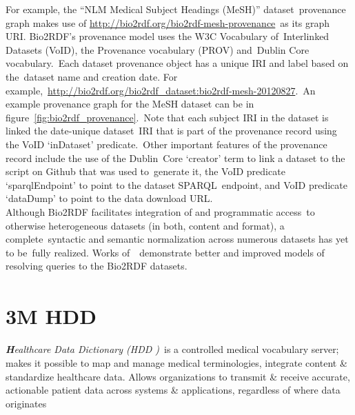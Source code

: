 \documentclass[DIV=calc, paper=a4, fontsize=12pt, onecolumn]{scrartcl}	 %
\newcommand{\initial}[1]{ %
\lettrine[lines=3,lhang=0.3,nindent=0em,slope=0em]{
\color{DarkBlue}
{\textbf{\textit{#1}}}}{}}
\begin{document}
  \noindent For example, the ``NLM Medical Subject Headings (MeSH)'' dataset\
  provenance graph makes use of \url{http://bio2rdf.org/bio2rdf-mesh-provenance}\
  as its graph URI. Bio2RDF's provenance model uses the W3C Vocabulary of\
  Interlinked Datasets (VoID), the Provenance vocabulary (PROV) and\
  Dublin Core vocabulary.\
  Each dataset provenance object has a unique IRI and label based on the\
  dataset name and creation date. For example,\
  \url{http://bio2rdf.org/bio2rdf_dataset:bio2rdf-mesh-20120827}.\
  An example provenance graph for the MeSH dataset can be in figure~\ref{fig:bio2rdf_provenance}.\
  Note that each subject IRI in the dataset is linked the date-unique dataset\
  IRI that is part of the provenance record using the VoID `inDataset' predicate.\
  Other important features of the provenance record include the use of the Dublin\
  Core `creator' term to link a dataset to the script on Github that was used to\
  generate it, the VoID predicate `sparqlEndpoint' to point to the dataset SPARQL\
  endpoint, and VoID predicate `dataDump' to point to the data download URL.\\
  
  \noindent Although Bio2RDF facilitates integration of and programmatic access\
  to otherwise heterogeneous datasets (in both, content and format), a complete\
  syntactic and semantic normalization across numerous datasets has yet to be\
  fully realized. Works of~\citep{ansell_model_2011, callahan_ontology-based_2013}\
  demonstrate better and improved models of resolving queries to the Bio2RDF datasets.\\


\section[3M\textsuperscript{\texttrademark} Healthcare Data Dictionary (HDD)]
{3M HDD\textsuperscript{\texttrademark}}
  \label{sec:hdd}
  
  \initial{H}\textit{ealthcare Data Dictionary (HDD )}\
 is a controlled medical vocabulary server; makes it possible to map and manage medical terminologies, integrate content \& standardize healthcare data. Allows organizations to transmit \& receive accurate, actionable patient data across systems \& applications, regardless of where data originates%
  
\end{document}
